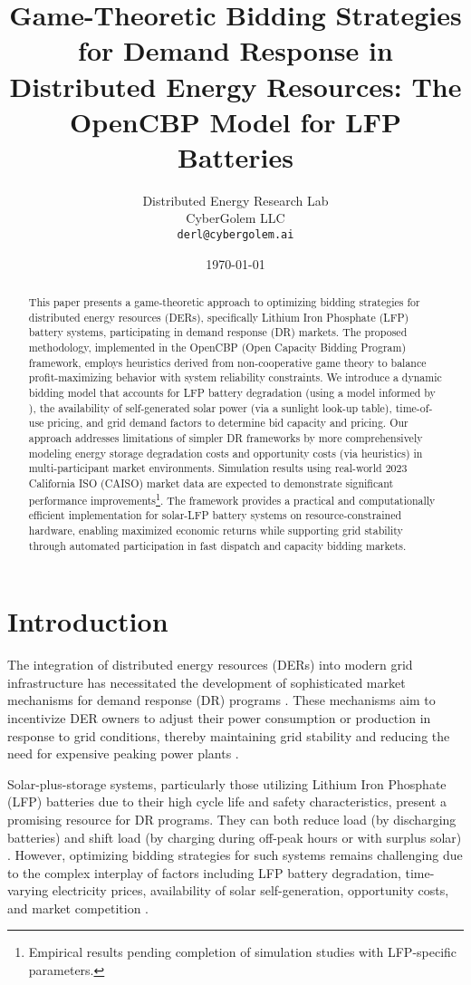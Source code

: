 \documentclass[11pt,a4paper]{article}
\title{Game-Theoretic Bidding Strategies for Demand Response in Distributed Energy Resources: The OpenCBP Model for LFP Batteries}
\author{Distributed Energy Research Lab\\
        CyberGolem LLC\\
        \texttt{derl@cybergolem.ai}}
\date{\today}
\begin{document}
\maketitle

\begin{abstract}
This paper presents a game-theoretic approach to optimizing bidding strategies for distributed energy resources (DERs), specifically Lithium Iron Phosphate (LFP) battery systems, participating in demand response (DR) markets. The proposed methodology, implemented in the OpenCBP (Open Capacity Bidding Program) framework, employs heuristics derived from non-cooperative game theory to balance profit-maximizing behavior with system reliability constraints. We introduce a dynamic bidding model that accounts for LFP battery degradation (using a model informed by \citet{Millner2010}), the availability of self-generated solar power (via a sunlight look-up table), time-of-use pricing, and grid demand factors to determine bid capacity and pricing. Our approach addresses limitations of simpler DR frameworks by more comprehensively modeling energy storage degradation costs and opportunity costs (via heuristics) in multi-participant market environments. Simulation results using real-world 2023 California ISO (CAISO) market data are expected to demonstrate significant performance improvements\footnote{Empirical results pending completion of simulation studies with LFP-specific parameters.}. The framework provides a practical and computationally efficient implementation for solar-LFP battery systems on resource-constrained hardware, enabling maximized economic returns while supporting grid stability through automated participation in fast dispatch and capacity bidding markets.
\end{abstract}

\section{Introduction}
The integration of distributed energy resources (DERs) into modern grid infrastructure has necessitated the development of sophisticated market mechanisms for demand response (DR) programs \citep{Siano2014}. These mechanisms aim to incentivize DER owners to adjust their power consumption or production in response to grid conditions, thereby maintaining grid stability and reducing the need for expensive peaking power plants \citep{Shariatzadeh2015}.

Solar-plus-storage systems, particularly those utilizing Lithium Iron Phosphate (LFP) batteries due to their high cycle life and safety characteristics, present a promising resource for DR programs. They can both reduce load (by discharging batteries) and shift load (by charging during off-peak hours or with surplus solar) \citep{Burger2017}. However, optimizing bidding strategies for such systems remains challenging due to the complex interplay of factors including LFP battery degradation, time-varying electricity prices, availability of solar self-generation, opportunity costs, and market competition \citep{He2016}.
\end{document}
